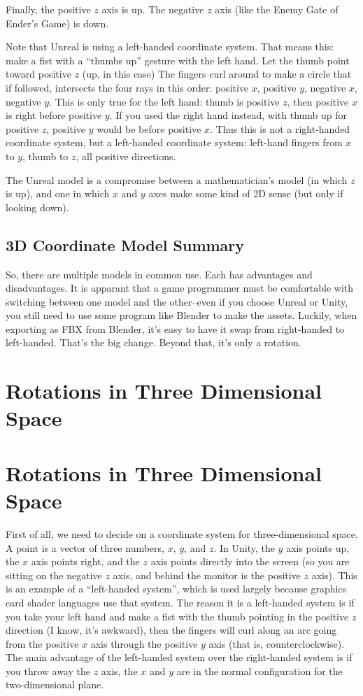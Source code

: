 \documentclass[letter,12pt]{article}
\begin{document}
Finally, the positive $z$ axis is up.  The negative $z$ axis (like the Enemy Gate of Ender’s Game) is down.

Note that Unreal is using a left-handed coordinate system.  That means this: make a fist with a “thumbs up” gesture with the left hand.  Let the thumb point toward positive $z$ (up, in this case) The fingers curl around to make a circle that if followed, intersects the four rays in this order: positive $x$, positive $y$, negative $x$, negative $y$.   This is only true for the left hand: thumb is positive $z$, then positive $x$ is right before positive $y$.  If you used the right hand instead, with thumb up for positive $z$, positive $y$ would be before positive $x$.  Thus this is not a right-handed coordinate system, but a left-handed coordinate system: left-hand fingers from $x$ to $y$, thumb to $z$, all positive directions.

The Unreal model is a compromise between a mathematician’s model (in which $z$ is up), and one in which $x$ and $y$ axes make some kind of 2D sense (but only if looking down).  

\subsection{3D Coordinate Model Summary}
So, there are multiple models in common use.  Each has advantages and disadvantages.  It is apparant that a game programmer must be comfortable with switching between one model and the other--even if you choose Unreal or Unity, you still need to use some program like Blender to make the assets.  Luckily, when exporting as FBX from Blender, it’s easy to have it swap from right-handed to left-handed.  That’s the big change.  Beyond that, it’s only a rotation.  


\section{Rotations in Three Dimensional Space}

 

\section{Rotations in Three Dimensional Space}

First of all, we need to decide on a coordinate system for three-dimensional space.  A point is a vector of three numbers, $x$, $y$, and $z$.  In Unity, the $y$ axis points up, the $x$ axis points right, and the $z$ axis points directly into the screen (so you are sitting on the negative $z$ axis, and behind the monitor is the positive $z$ axis).  This is an example of a “left-handed system”, which is used largely because graphics card shader languages use that system.  The reason it is a left-handed system is if you take your left hand and make a fist with the  thumb pointing in the positive $z$ direction (I know, it’s awkward), then the fingers will curl along an arc going from the positive $x$ axis through the positive $y$ axis (that is, counterclockwise).  The main advantage of the left-handed system over the right-handed system is if you throw away the $z$ axis, the $x$ and $y$ are in the normal configuration for the two-dimensional plane.
\end{document}

